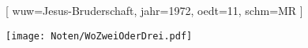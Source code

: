 [
    wuw={Jesus-Bruderschaft}, 
    jahr={1972},
    oedt={11},
    schm={MR}
]

\beginverse
\endverse
\texttt{[image: Noten/WoZweiOderDrei.pdf]}

\endsong
